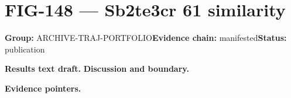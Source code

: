 \clearpage
\section{FIG-148 --- Sb2te3cr 61 similarity}
\label{figpage:fig-148}
\textbf{Group:} ARCHIVE-TRAJ-PORTFOLIO\quad \textbf{Evidence chain:} manifested\quad \textbf{Status:} publication

\textbf{Results text draft.} 
\textbf{Discussion and boundary.} 


\textbf{Evidence pointers.}



\vfill
